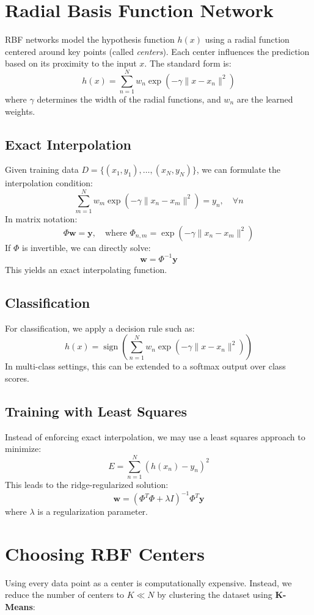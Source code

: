 \documentclass[twocolumn]{article} %
\begin{document}
\section{Radial Basis Function Network}

RBF networks model the hypothesis function $h(x)$ using a radial function centered around key points (called \emph{centers}). Each center influences the prediction based on its proximity to the input $x$. The standard form is:
\[
h(x) = \sum_{n=1}^N w_n\exp\left(-\gamma\| x - x_n \|^2\right)
\]
where $\gamma$ determines the width of the radial functions, and $w_n$ are the learned weights.

\subsection{Exact Interpolation}
Given training data $D = \{(x_1, y_1), \dots, (x_N, y_N)\}$, we can formulate the interpolation condition:
\[
\sum_{m=1}^N w_m\exp\left(-\gamma\| x_n - x_m \|^2\right) = y_n, \quad \forall n
\]
In matrix notation:
\[
\Phi \mathbf{w} = \mathbf{y}, \quad \text{where } \Phi_{n,m} = \exp\left(-\gamma\|x_n - x_m\|^2\right)
\]
If $\Phi$ is invertible, we can directly solve:
\[
\mathbf{w} = \Phi^{-1} \mathbf{y}
\]
This yields an exact interpolating function.

\subsection{Classification}
For classification, we apply a decision rule such as:
\[
h(x) = \operatorname{sign}\left(\sum_{n=1}^N w_n\exp(-\gamma\|x - x_n\|^2)\right)
\]
In multi-class settings, this can be extended to a softmax output over class scores.

\subsection{Training with Least Squares}
Instead of enforcing exact interpolation, we may use a least squares approach to minimize:
\[
E = \sum_{n=1}^N (h(x_n) - y_n)^2
\]
This leads to the ridge-regularized solution:
\[
\mathbf{w} = (\Phi^T\Phi + \lambda I)^{-1}\Phi^T \mathbf{y}
\]
where $\lambda$ is a regularization parameter.

\section{Choosing RBF Centers}
Using every data point as a center is computationally expensive. Instead, we reduce the number of centers to $K \ll N$ by clustering the dataset using \textbf{K-Means}:
\end{document}
